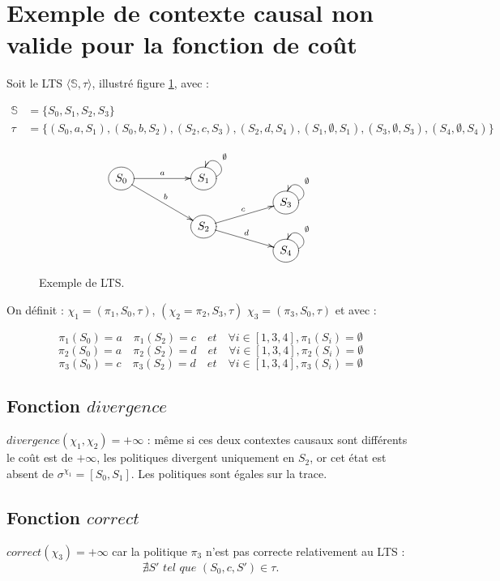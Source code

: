 \section{Exemple de contexte causal non valide pour la fonction de coût}
Soit le LTS $\langle \mathds{S},\tau \rangle$, illustré figure \ref{lts_an}, avec :


\begin{equation*}
    \begin{aligned}
        \mathds{S} & = \{S_0,S_1,S_2,S_3\} \\
        \tau &= \{(S_0,a,S_1),(S_0,b,S_2),(S_2,c,S_3),(S_2,d,S_4),(S_1,\emptyset,S_1),(S_3,\emptyset,S_3),(S_4,\emptyset,S_4)\}
    \end{aligned}
\end{equation*}

\begin{figure}[h!]
    \centering
    \[
        \xymatrix @R=0.1em@C=5em {
        *++[o][F-]{S_0} \ar[r]^{a} \ar[rdd]^b & *++[o][F-]{S_1} \ar@(r,u)[]_{\emptyset}
        \\ & & *++[o][F-]{S_3} \ar@(r,u)[]_{\emptyset}
        \\ & *++[o][F-]{S_2} \ar[ru]^c \ar[rd]^d &
         \\ & & *++[o][F-]{S_4} \ar@(r,u)[]_{\emptyset}
        }    
    \]
    \caption{Exemple de LTS.}
    \label{lts_an}
\end{figure}

On définit :
$\chi_1 = (\pi_1,S_0,\tau)$, $(\chi_2 = \pi_2,S_3,\tau)$ $\chi_3 = (\pi_3,S_0,\tau)$ et  avec :

$$\pi_1(S_0) = a \quad \pi_1(S_2)=c \quad et \quad \forall i\in[1,3,4],\pi_1(S_i)= \emptyset$$
$$\pi_2(S_0) = a \quad \pi_2(S_2)=d \quad et \quad \forall i\in[1,3,4],\pi_2(S_i)= \emptyset$$
$$\pi_3(S_0) = c \quad \pi_3(S_2)=d \quad et \quad \forall i\in[1,3,4],\pi_3(S_i)= \emptyset$$



\subsection{Fonction $divergence$}\label{ex_div}

$divergence(\chi_1,\chi_2)= +\infty$ : même si ces deux contextes causaux sont différents le coût est de $+\infty$, les politiques divergent uniquement en $S_2$, or cet état est absent de $\sigma^{\chi_1}=[S_0,S_1]$. Les politiques sont égales sur la trace.

\subsection{Fonction $correct$}\label{ex_corr}
$correct(\chi_3) = +\infty$ car la politique $\pi_3$ n'est pas correcte relativement au LTS : $$\nexists S' \textit{ tel que } (S_0,c,S')\in \tau.$$
